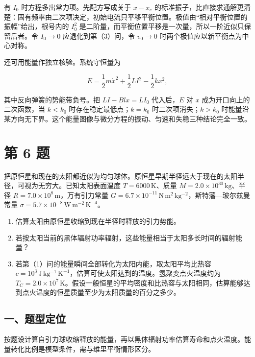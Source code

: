 \documentclass[12pt,a4paper,UTF8]{ctexart}
\newcommand{\tightlist}{\setlength{\itemsep}{0pt}\setlength{\parskip}{0pt}}
\begin{document}
有 \(I_0\) 时方程多出常力项。先配方写成关于 \(x-x_e\)
的标准振子，比直接求通解更清楚：固有频率由二次项决定，初始电流只平移平衡位置。极值由``相对平衡位置的振幅''给出，根号内的
\(I_0^2\) 是二阶量，而平衡位置平移是一次量，所以一阶近似只保留后者。令
\(I_0\to0\) 应退化到第（3）问，令 \(v_0\to0\)
时两个极值应以新平衡点为中心对称。

还可用能量作独立核验。系统守恒量为

\[E=\frac12m\dot x^2+\frac12LI^2-\frac12kx^2,\]

其中反向弹簧的势能带负号。把 \(LI-Blx=LI_0\) 代入后，\(E\) 对 \(x\)
成为开口向上的二次函数，当 \(k<k_0\) 时存在稳定最低点；\(k=k_0\)
时二次项消失；\(k>k_0\)
时能量沿某方向无下界。这个能量图像与微分方程的振动、匀速和失稳三种结论完全一致。

\newpage

\section{第 6 题}\label{ux7b2c-6-ux9898}

把原恒星和现在的太阳都近似为均匀球体。原恒星早期半径远大于现在的太阳半径，可视为无穷大。已知太阳表面温度
\(T=6000\,\mathrm K\)、质量 \(M=2.0\times10^{30}\,\mathrm{kg}\)、半径
\(R=7.0\times10^8\,\mathrm m\)，万有引力常量
\(G=6.7\times10^{-11}\,\mathrm{N\,m^2\,kg^{-2}}\)，斯特藩---玻尔兹曼常量
\(\sigma=5.7\times10^{-8}\,\mathrm{W\,m^{-2}\,K^{-4}}\)。

\begin{enumerate}
\def\labelenumi{\arabic{enumi}.}
\tightlist
\item
  估算太阳由原恒星收缩到现在半径时释放的引力势能。
\item
  若按太阳当前的黑体辐射功率辐射，这些能量相当于太阳多长时间的辐射能量？
\item
  若第（1）问的能量瞬间全部转化为太阳内能，取太阳平均比热容
  \(c=10^3\,\mathrm{J\,kg^{-1}\,K^{-1}}\)，估算可使太阳达到的温度。氢聚变点火温度约为
  \(T_C=2.0\times10^7\,\mathrm K\)。假设一般恒星的平均密度和比热容与太阳相同，估算能够达到点火温度的恒星质量至少为太阳质量的百分之多少。
\end{enumerate}

\subsection{一、题型定位}\label{ux4e00ux9898ux578bux5b9aux4f4d-5}

按题设计算自引力球收缩释放的能量，再以黑体辐射功率估算寿命和点火温度。能量转化比例是模型条件，需与维里平衡情形区分。
\end{document}
